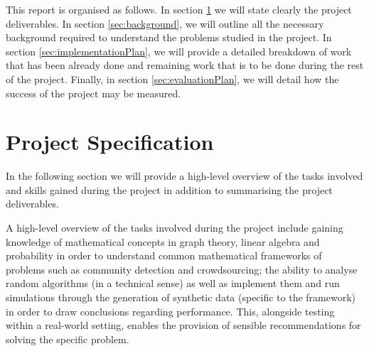 \documentclass[12pt]{article}
\numberwithin{equation}{section}
\begin{document}
This report is organised as follows. In section \ref{sec:projectSpecification} we will state clearly the project deliverables. In section \ref{sec:background}, we will outline all the necessary background required to understand the problems studied in the project. In section \ref{sec:implementationPlan}, we will provide a detailed breakdown of work that has been already done and remaining work that is to be done during the rest of the project. Finally, in section \ref{sec:evaluationPlan}, we will detail how the success of the project may be measured.


\newpage
\thispagestyle{plain}
\mbox{}
\section {Project Specification}
\label{sec:projectSpecification}

In the following section we will provide a high-level overview of the tasks involved and skills gained during the project in addition to summarising the project deliverables.

A high-level overview of the tasks involved during the project include gaining knowledge of mathematical concepts in graph theory, linear algebra and probability in order to understand common mathematical frameworks of problems such as community detection and crowdsourcing; the ability to analyse random algorithms (in a technical sense) as well as implement them and run simulations through the generation of synthetic data (specific to the framework) in order to draw conclusions regarding performance. This, alongside testing within a real-world setting, enables the provision of sensible recommendations for solving the specific problem.
\end{document}
